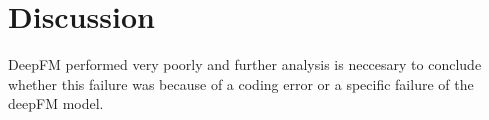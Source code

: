 \documentclass[fleqn,moreauthors,10pt]{ds_report}
\begin{document}
\section*{Discussion}

DeepFM performed very poorly and further analysis is neccesary to conclude whether this failure was because of a coding error or a specific failure of the deepFM model.







\end{document}
